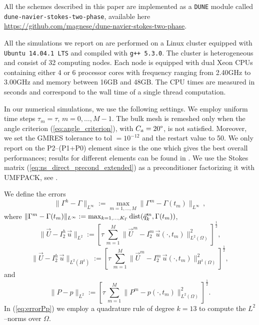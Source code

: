 \documentclass[a4paper,12pt,onecolumn]{article}
\newcommand{\errorXx}{\|\Gamma^h - \Gamma\|_{L^\infty}}
\newcommand{\LerrorUu}[1]{\|\vec U - I^h_{#1}\,\vec u\|_{L^2}}
\newcommand{\HerrorUu}[1]{\|\vec U - I^h_{#1}\,\vec u\|_{L^2(H^1)}}
\newcommand{\LerrorPp}{\|P - p\|_{L^2}}
\newcommand{\myurl}[1]{\hfil\penalty 100 \hfilneg \hbox{\url{#1}}} %
\begin{document}
All the schemes described in this paper are implemented as a \verb|DUNE| module
called \verb|dune-navier-stokes-two-phase|, available here
\myurl{https://github.com/magnese/dune-navier-stokes-two-phase}.

All the simulations we report on are performed on a Linux cluster equipped with
\verb|Ubuntu 14.04.1 LTS| and compiled with \verb|g++ 5.3.0|. The cluster is
heterogeneous and consist of 32 computing nodes. Each node is equipped
with dual Xeon CPUs containing either 4 or 6 processor cores with frequency
ranging from 2.40GHz to 3.00GHz and memory between 16GB and 48GB. The CPU times
are measured in seconds and correspond to the wall time of a single thread
computation.

In our numerical simulations, we use the following settings. We employ uniform
time steps $\tau_m=\tau$, $m=0,\ldots, M-1$. The bulk mesh is remeshed only
when the angle criterion (\ref{eq:angle_criterion}), with $C_a=20\degree$, is
not satisfied. Moreover, we set the GMRES tolerance to tol $=10^{-12}$ and the
restart value to 50. We only report on the P2--(P1+P0) element since is the one
which gives the best overall performances; results for different elements can be
found in \cite{Agnese}. We use the Stokes matrix
(\ref{eq:ns_direct_precond_extended}) as a preconditioner factorizing it with
UMFPACK, see \cite{Davis04}.

We define the errors
\begin{equation} \label{eq:errorXx}
\errorXx := \max_{m=1,\ldots, M} \|\Gamma^m - \Gamma(t_m)\|_{L^\infty}\,,
\end{equation}
where $\|\Gamma^m - \Gamma(t_m)\|_{L^\infty} :=
\max_{k=1,\ldots, K_\Gamma} {\rm dist}( \vec q^m_k, \Gamma(t_m))$,
\begin{equation} \label{eq:errorLUu}
\LerrorUu2 := \left[\tau\,\sum_{m=1}^M \|\vec U^m - I^m_2\,\vec u(\cdot,
t_m)\|_{L^2(\Omega)}^2 \right]^\frac12,
\end{equation}
\begin{equation} \label{eq:errorHUu}
\HerrorUu2 := \left[\tau\,\sum_{m=1}^M \|\vec U^m - I^m_2\,\vec u(\cdot,
t_m)\|_{H^1(\Omega)}^2 \right]^\frac12,
\end{equation}
and
\begin{equation} \label{eq:errorPp}
\LerrorPp := \left[\tau\,\sum_{m=1}^M \|P^m - p(\cdot,t_m)\|_{L^2(\Omega)}^2
\right]^\frac12.
\end{equation}
In (\ref{eq:errorPp}) we employ a quadrature rule of degree $k=13$ to compute
the $L^2$--norms over $\Omega$.
\end{document}
